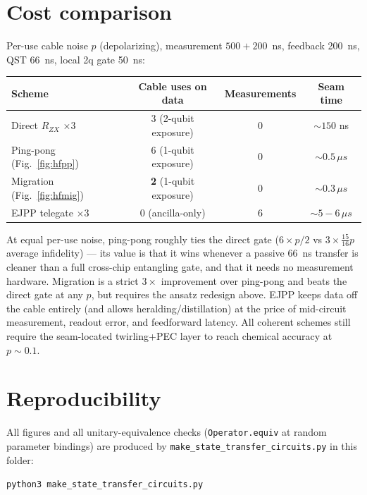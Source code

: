 \documentclass[11pt]{article}
\newcommand{\RZX}{R_{ZX}}
\begin{document}
\section{Cost comparison}

Per-use cable noise $p$ (depolarizing), measurement $500{+}200$~ns,
feedback 200~ns, QST 66~ns, local 2q gate 50~ns:

\begin{center}
\begin{tabular}{lccc}
\toprule
Scheme & Cable uses on data & Measurements & Seam time \\
\midrule
Direct $\RZX$ $\times 3$          & 3 (2-qubit exposure) & 0 & ${\sim}150$ ns \\
Ping-pong (Fig.~\ref{fig:hfpp})   & 6 (1-qubit exposure) & 0 & ${\sim}0.5\,\mu s$ \\
Migration (Fig.~\ref{fig:hfmig})  & \textbf{2} (1-qubit exposure) & 0 & ${\sim}0.3\,\mu s$ \\
EJPP telegate $\times 3$          & 0 (ancilla-only)     & 6 & ${\sim}5{-}6\,\mu s$ \\
\bottomrule
\end{tabular}
\end{center}

At equal per-use noise, ping-pong roughly ties the direct gate
($6 \times p/2$ vs $3 \times \tfrac{15}{16}p$ average infidelity) --- its
value is that it wins whenever a passive 66~ns transfer is cleaner than a
full cross-chip entangling gate, and that it needs no measurement hardware.
Migration is a strict $3\times$ improvement over ping-pong and beats the
direct gate at any $p$, but requires the ansatz redesign above. EJPP keeps
data off the cable entirely (and allows heralding/distillation) at the price
of mid-circuit measurement, readout error, and feedforward latency. All
coherent schemes still require the seam-located twirling{+}PEC layer to
reach chemical accuracy at $p \sim 0.1$.

\section*{Reproducibility}

All figures and all unitary-equivalence checks
(\texttt{Operator.equiv} at random parameter bindings) are produced by
\texttt{make\_state\_transfer\_circuits.py} in this folder:
\begin{center}
\texttt{python3 make\_state\_transfer\_circuits.py}
\end{center}
\end{document}
